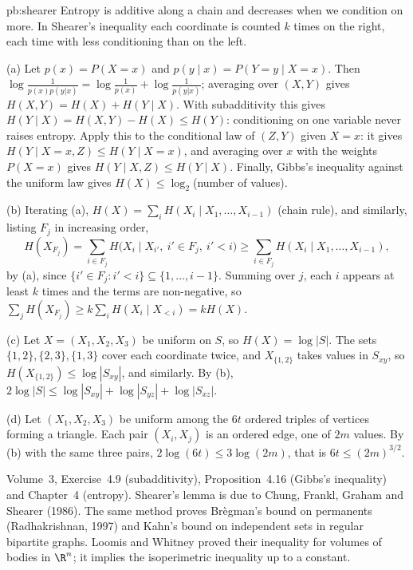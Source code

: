 \begin{solution}{pb:shearer}
\idea Entropy is additive along a chain and decreases when we condition on more. In Shearer's inequality each coordinate is
counted $k$ times on the right, each time with less conditioning than on the left.

\writeup (a) Let $p(x)=P(X=x)$ and $p(y\mid x)=P(Y=y\mid X=x)$. Then $\log\frac1{p(x)p(y|x)}=\log\frac1{p(x)}+\log\frac1{p(y|x)}$; averaging over $(X,Y)$ gives
$H(X,Y)=H(X)+H(Y\mid X)$. With subadditivity this gives $H(Y\mid X)=H(X,Y)-H(X)\le H(Y)$: conditioning on one variable never
raises entropy. Apply this to the conditional law of $(Z,Y)$ given $X=x$: it gives $H(Y\mid X=x,Z)\le H(Y\mid X=x)$, and averaging over
$x$ with the weights $P(X=x)$ gives $H(Y\mid X,Z)\le H(Y\mid X)$. Finally, Gibbs's inequality
against the uniform law gives $H(X)\le\log_2$(number of values).

(b) Iterating (a), $H(X)=\sum_iH(X_i\mid X_1,\dots,X_{i-1})$ (chain rule), and similarly, listing $F_j$ in increasing order,
\[
H(X_{F_j})=\sum_{i\in F_j}H\bigl(X_i\mid X_{i'},\ i'\in F_j,\ i'<i\bigr)\ge\sum_{i\in F_j}H(X_i\mid X_1,\dots,X_{i-1}),
\]
by (a), since $\{i'\in F_j:i'<i\}\subseteq\{1,\dots,i-1\}$. Summing over $j$, each $i$ appears at least $k$ times and the terms are non-negative, so
$\sum_jH(X_{F_j})\ge k\sum_iH(X_i\mid X_{<i})=kH(X)$.

(c) Let $X=(X_1,X_2,X_3)$ be uniform on $S$, so $H(X)=\log|S|$. The sets $\{1,2\},\{2,3\},\{1,3\}$ cover each coordinate twice, and $X_{\{1,2\}}$ takes
values in $S_{xy}$, so $H(X_{\{1,2\}})\le\log|S_{xy}|$, and similarly. By (b), $2\log|S|\le\log|S_{xy}|+\log|S_{yz}|+\log|S_{xz}|$.

(d) Let $(X_1,X_2,X_3)$ be uniform among the $6t$ ordered triples of vertices forming a triangle. Each pair $(X_i,X_j)$ is an ordered edge, one of
$2m$ values. By (b) with the same three pairs, $2\log(6t)\le3\log(2m)$, that is $6t\le(2m)^{3/2}$.

\tools Volume~3, Exercise~4.9 (subadditivity), Proposition~4.16 (Gibbs's inequality) and Chapter~4 (entropy).
\leads Shearer's lemma is due to Chung, Frankl, Graham and Shearer (1986). The same method proves Brègman's bound on permanents
(Radhakrishnan, 1997) and Kahn's bound on independent sets in regular bipartite graphs. Loomis and Whitney proved their inequality
for volumes of bodies in $\R^n$; it implies the isoperimetric inequality up to a constant.
\end{solution}

